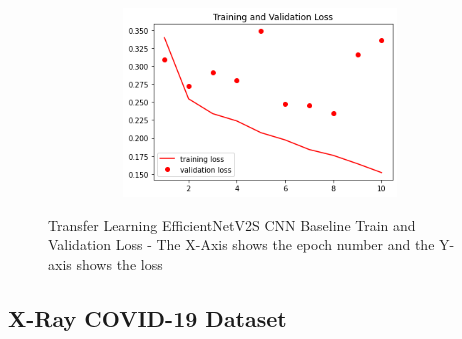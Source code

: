  \begin{figure}[H]
    \centering
    \includegraphics[width=1\textwidth,height=5cm,keepaspectratio]{Images/EfficientNetV2SBaselineTrainingValidationLossRadiography.png}\\
    \caption{Transfer Learning EfficientNetV2S CNN Baseline Train and Validation Loss  - The X-Axis shows the epoch number and the Y-axis shows the loss}
    \label{fig:Transfer Learning EfficientNetV2S CNN Baseline Train and Validation Loss Radiography}
\end{figure}
\subsection{X-Ray COVID-19 Dataset}
